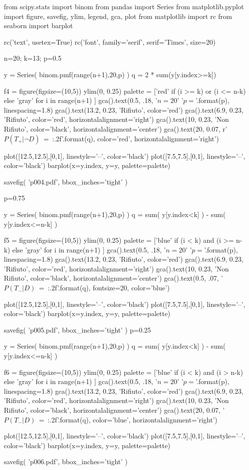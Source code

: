 \documentclass[10pt,openany]{book}
\theoremstyle{mio}
\theoremstyle{liscio}
\begin{document}
\begin{pycode}
from scipy.stats import binom
from pandas import Series
from matplotlib.pyplot import figure, savefig, ylim, legend, gca, plot
from matplotlib import rc
from seaborn import barplot

rc('text', usetex=True)
rc('font', family='serif', serif='Times', size=20)


n=20; k=13; p=0.5

y = Series( binom.pmf(range(n+1),20,p) )
q = 2 * sum(y[y.index>=k])

f4 = figure(figsize=(10,5))
ylim(0, 0.25)
palette = ['red' if (i >= k) or (i <= n-k) else 'gray' for i in range(n+1) ]
gca().text(0.5, .18, '$n=20$\n' '$p={}$'.format(p), linespacing=1.8)
gca().text(13.2, 0.23, 'Rifiuto', color='red')
gca().text(6.9, 0.23, 'Rifiuto', color='red', horizontalalignment='right')
gca().text(10, 0.23, 'Non Rifiuto', color='black', horizontalalignment='center')
gca().text(20, 0.07, r'$P(T_+|\neg D)$\ =\ {:.2f}'.format(q), color='red', horizontalalignment='right')

plot([12.5,12.5],[0,1], linestyle='--', color='black')
plot([7.5,7.5],[0,1], linestyle='--', color='black')
barplot(x=y.index, y=y, palette=palette)

savefig( 'p004.pdf', bbox_inches='tight' )

p=0.75

y = Series( binom.pmf(range(n+1),20,p) )
q = sum( y[y.index<k] ) -  sum( y[y.index<=n-k] )

f5 = figure(figsize=(10,5))
ylim(0, 0.25)
palette = ['blue' if (i < k) and (i >= n-k) else 'gray' for i in range(n+1) ]
gca().text(0.5, .18, '$n=20$\n' '$p={}$'.format(p), linespacing=1.8)
gca().text(13.2, 0.23, 'Rifiuto', color='red')
gca().text(6.9, 0.23, 'Rifiuto', color='red', horizontalalignment='right')
gca().text(10, 0.23, 'Non Rifiuto', color='black', horizontalalignment='center')
gca().text(0.5, .07, '$P(T_-|D)$\ =\ {:.2f}'.format(q), fontsize=20, color='blue')

plot([12.5,12.5],[0,1],  linestyle='--', color='black')
plot([7.5,7.5],[0,1],  linestyle='--', color='black')
barplot(x=y.index, y=y, palette=palette)

savefig( 'p005.pdf', bbox_inches='tight' )
p=0.25

y = Series( binom.pmf(range(n+1),20,p) )
q = sum( y[y.index<k] ) -  sum( y[y.index<=n-k] )

f6 = figure(figsize=(10,5))
ylim(0, 0.25)
palette = ['blue' if (i < k) and (i > n-k) else 'gray' for i in range(n+1) ]
gca().text(0.5, .18, '$n=20$\n' '$p={}$'.format(p), linespacing=1.8)
gca().text(13.2, 0.23, 'Rifiuto', color='red')
gca().text(6.9, 0.23, 'Rifiuto', color='red', horizontalalignment='right')
gca().text(10, 0.23, 'Non Rifiuto', color='black', horizontalalignment='center')
gca().text(20, 0.07, '$P(T_-|D)$\ =\ {:.2f}'.format(q), color='blue', horizontalalignment='right')

plot([12.5,12.5],[0,1],  linestyle='--', color='black')
plot([7.5,7.5],[0,1], linestyle='--', color='black')
barplot(x=y.index, y=y, palette=palette)

savefig( 'p006.pdf', bbox_inches='tight' )


\end{pycode}
\end{document}
